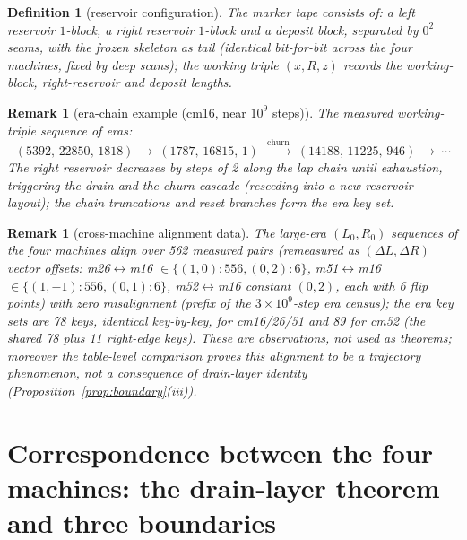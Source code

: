 \documentclass[11pt]{amsart}
\newtheorem{definition}[theorem]{Definition}
\newtheorem{remark}[theorem]{Remark}
\begin{document}
\begin{definition}[reservoir configuration]
The marker tape consists of: a left reservoir $1$-block, a right reservoir $1$-block and a deposit block, separated by $0^2$ seams, with the frozen skeleton as tail (identical bit-for-bit across the four machines, fixed by deep scans); the working triple $(x,R,z)$ records the working-block, right-reservoir and deposit lengths.
\end{definition}

\begin{remark}[era-chain example (cm16, near $10^9$ steps)]
The measured working-triple sequence of eras:
\[
(5392,\,22850,\,1818)\ \longrightarrow\ (1787,\,16815,\,1)\ \xrightarrow{\ \text{churn}\ }\ (14188,\,11225,\,946)\ \longrightarrow\ \cdots
\]
The right reservoir decreases by steps of 2 along the lap chain until exhaustion, triggering the drain and the churn cascade (reseeding into a new reservoir layout); the chain truncations and reset branches form the era key set.
\end{remark}

\begin{remark}[cross-machine alignment data]
The large-era $(L_0,R_0)$ sequences of the four machines align over 562 measured pairs (remeasured as $(\Delta L,\Delta R)$ vector offsets: m26$\leftrightarrow$m16 $\in\{(1,0){:}556,(0,2){:}6\}$, m51$\leftrightarrow$m16 $\in\{(1,{-}1){:}556,(0,1){:}6\}$, m52$\leftrightarrow$m16 constant $(0,2)$, each with 6 flip points) with zero misalignment (prefix of the $3\times10^9$-step era census); the era key sets are 78 keys, identical key-by-key, for cm16/26/51 and 89 for cm52 (the shared 78 plus 11 right-edge keys). These are observations, not used as theorems; moreover the table-level comparison proves this alignment to be a \emph{trajectory phenomenon}, not a consequence of drain-layer identity (Proposition~\ref{prop:boundary}(iii)).
\end{remark}

\section{Correspondence between the four machines: the drain-layer theorem and three boundaries}\label{sec:corr}
\end{document}
